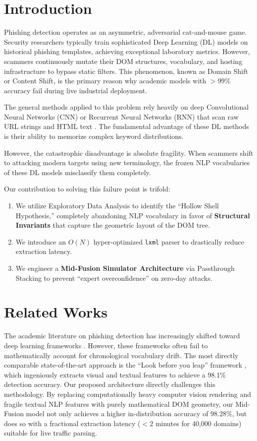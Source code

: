 \documentclass[conference]{IEEEtran}
\begin{document}
\section{Introduction}
Phishing detection operates as an asymmetric, adversarial cat-and-mouse game. Security researchers typically train sophisticated Deep Learning (DL) models on historical phishing templates, achieving exceptional laboratory metrics. However, scammers continuously mutate their DOM structures, vocabulary, and hosting infrastructure to bypass static filters. This phenomenon, known as Domain Shift or Content Shift, is the primary reason why academic models with $>$99\% accuracy fail during live industrial deployment. 

The general methods applied to this problem rely heavily on deep Convolutional Neural Networks (CNN) or Recurrent Neural Networks (RNN) that scan raw URL strings and HTML text \cite{web_phishing_dl, dl_framework_phishing}. The fundamental advantage of these DL methods is their ability to memorize complex keyword distributions. 

However, the catastrophic disadvantage is absolute fragility. When scammers shift to attacking modern targets using new terminology, the frozen NLP vocabularies of these DL models misclassify them completely. 

Our contribution to solving this failure point is trifold:
\begin{enumerate}
    \item We utilize Exploratory Data Analysis to identify the ``Hollow Shell Hypothesis,'' completely abandoning NLP vocabulary in favor of \textbf{Structural Invariants} that capture the geometric layout of the DOM tree.
    \item We introduce an $O(N)$ hyper-optimized \texttt{lxml} parser to drastically reduce extraction latency.
    \item We engineer a \textbf{Mid-Fusion Simulator Architecture} via Passthrough Stacking to prevent ``expert overconfidence'' on zero-day attacks.
\end{enumerate}

\section{Related Works}
The academic literature on phishing detection has increasingly shifted toward deep learning frameworks \cite{dl_framework_phishing}. However, these frameworks often fail to mathematically account for chronological vocabulary drift. The most directly comparable state-of-the-art approach is the ``Look before you leap'' framework \cite{look_before_leap}, which ingeniously extracts visual and textual features to achieve a 98.1\% detection accuracy. Our proposed architecture directly challenges this methodology. By replacing computationally heavy computer vision rendering and fragile textual NLP features with purely mathematical DOM geometry, our Mid-Fusion model not only achieves a higher in-distribution accuracy of 98.28\%, but does so with a fractional extraction latency ($<$2 minutes for 40,000 domains) suitable for live traffic parsing.
\end{document}
